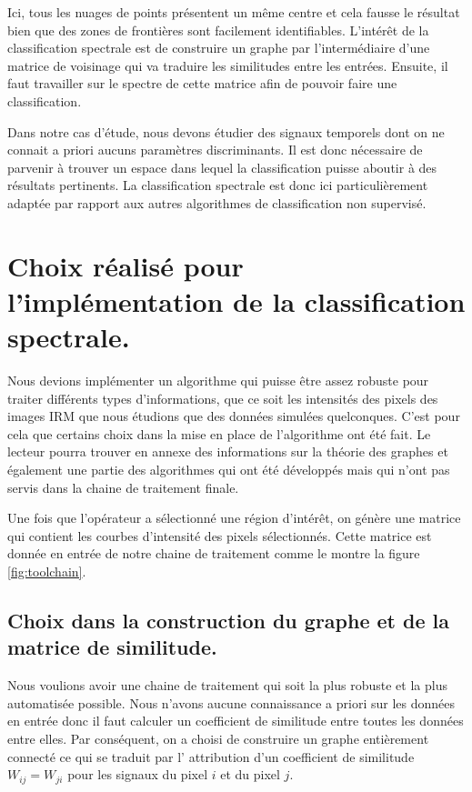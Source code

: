 Ici, tous les nuages de points présentent un même centre et cela fausse le résultat bien que des zones de frontières sont facilement identifiables. L'intérêt de la classification spectrale est de construire un graphe par l'intermédiaire d'une matrice de voisinage qui va traduire les similitudes entre les entrées. Ensuite, il faut travailler sur le spectre de cette matrice afin de pouvoir faire une classification. 

\medskip

Dans notre cas d'étude, nous devons étudier des signaux temporels dont on ne connait a priori aucuns paramètres discriminants. Il est donc nécessaire de parvenir à trouver un espace dans lequel la classification puisse aboutir à des résultats pertinents. La classification spectrale est donc ici particulièrement adaptée par rapport aux autres algorithmes de classification non supervisé.

\chapter{Choix réalisé pour l'implémentation de la classification spectrale.}

Nous devions implémenter un algorithme qui puisse être assez robuste pour traiter différents types d'informations, que ce soit les intensités des pixels des images IRM que nous étudions que des données simulées quelconques. C'est pour cela que certains choix dans la mise en place de l'algorithme ont été fait. Le lecteur pourra trouver en annexe des informations sur la théorie des graphes et également une partie des algorithmes qui ont été développés mais qui n'ont pas servis dans la chaine de traitement finale.

Une fois que l'opérateur a sélectionné une région d'intérêt, on génère une matrice qui contient les courbes d'intensité des pixels sélectionnés. Cette matrice est donnée en entrée de notre chaine de traitement comme le montre la figure \ref{fig:toolchain}.

\section{Choix dans la construction du graphe et de la matrice de similitude.}

Nous voulions avoir une chaine de traitement qui soit la plus robuste et la plus automatisée possible. Nous n'avons aucune connaissance a priori sur les données en entrée donc il faut calculer un coefficient de similitude entre toutes les données entre elles. Par conséquent, on a choisi de construire un graphe entièrement connecté ce qui se traduit par l' attribution d'un coefficient de similitude $W_{ij} = W_{ji}$ pour les signaux du pixel $i$ et du pixel $j$.  

